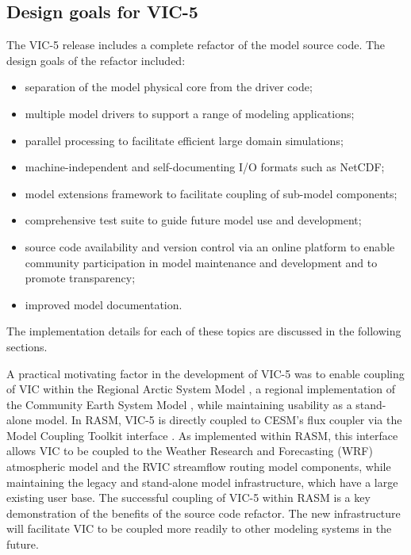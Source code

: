 \documentclass[gmd, manuscript]{copernicus}
\begin{document}
  \subsection{Design goals for VIC-5}
    \label{sec:vic-5}
    The VIC-5 release includes a complete refactor of the model source code. The design goals of the refactor included:

    \begin{itemize}
      \item separation of the model physical core from the driver code;
      \item multiple model drivers to support a range of modeling applications;
      \item parallel processing to facilitate efficient large domain simulations;
      \item machine-independent and self-documenting I/O formats such as NetCDF;
      \item model extensions framework to facilitate coupling of sub-model components;
      \item comprehensive test suite to guide future model use and development;
      \item source code availability and version control via an online platform to enable community participation in model maintenance and development and to promote transparency;
      \item improved model documentation.
    \end{itemize}
    The implementation details for each of these topics are discussed in the following sections.

    A practical motivating factor in the development of VIC-5 was to enable coupling of VIC within the Regional Arctic System Model \citep[RASM;][]{Hamman_2016a}, a regional implementation of the Community Earth System Model \citep[CESM;][]{Hurrell_2013}, while maintaining usability as a stand-alone model. In RASM, VIC-5 is directly coupled to CESM's flux coupler \citep[CPL7;][]{Craig_2012} via the Model Coupling Toolkit interface \citep[MCT;][]{Larson_2005}. As implemented within RASM, this interface allows VIC to be coupled to the Weather Research and Forecasting (WRF) atmospheric model \citep{Skamarock_2008} and the RVIC streamflow routing model \citep{Hamman_2017a} components, while maintaining the legacy and stand-alone model infrastructure, which have a large existing user base. The successful coupling of VIC-5 within RASM is a key demonstration of the benefits of the source code refactor. The new infrastructure will facilitate VIC to be coupled more readily to other modeling systems in the future.
\end{document}
